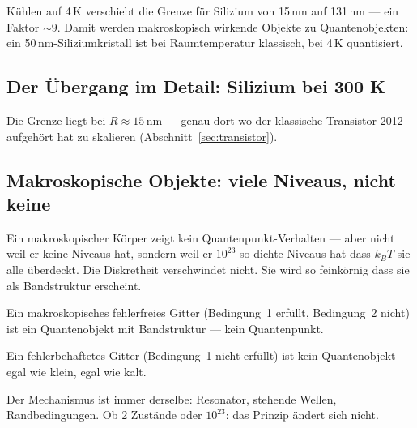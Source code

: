 Kühlen auf 4\,K verschiebt die Grenze für Silizium
von 15\,nm auf 131\,nm --- ein Faktor $\sim 9$.
Damit werden makroskopisch wirkende Objekte zu Quantenobjekten:
ein 50\,nm-Siliziumkristall ist bei Raumtemperatur klassisch,
bei 4\,K quantisiert.

\subsection{Der Übergang im Detail: Silizium bei 300 K}

\begin{center}
\end{center}

Die Grenze liegt bei $R \approx 15$\,nm --- genau dort
wo der klassische Transistor 2012 aufgehört hat zu skalieren
(Abschnitt~\ref{sec:transistor}).

\subsection{Makroskopische Objekte: viele Niveaus, nicht keine}

Ein makroskopischer Körper zeigt kein Quantenpunkt-Verhalten ---
aber nicht weil er keine Niveaus hat, sondern weil er
$10^{23}$ so dichte Niveaus hat dass $k_BT$ sie alle überdeckt.
Die Diskretheit verschwindet nicht. Sie wird so feinkörnig
dass sie als Bandstruktur erscheint.

\begin{keypoint}
Ein makroskopisches fehlerfreies Gitter (Bedingung~1 erfüllt,
Bedingung~2 nicht) ist ein Quantenobjekt mit Bandstruktur ---
kein Quantenpunkt.

Ein fehlerbehaftetes Gitter (Bedingung~1 nicht erfüllt)
ist kein Quantenobjekt --- egal wie klein, egal wie kalt.

Der Mechanismus ist immer derselbe: Resonator, stehende Wellen,
Randbedingungen. Ob 2 Zustände oder $10^{23}$: das Prinzip
ändert sich nicht.
\end{keypoint}

